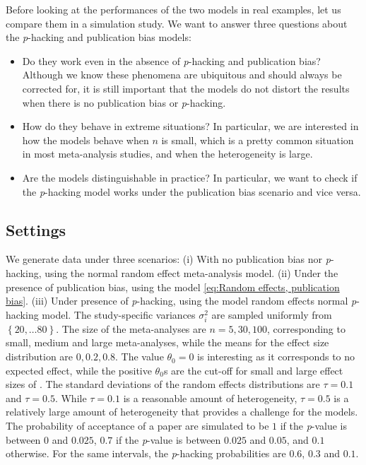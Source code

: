\documentclass{article}
\theoremstyle{plain}
\theoremstyle{definition}
\begin{document}
%
%
Before looking at the performances of the two models in real examples, let us compare them in a simulation study. We want to answer three questions about the \textit{p}-hacking and publication bias models:
\begin{itemize}
\item Do they work even in the absence of \textit{p}-hacking and publication bias? Although we know these phenomena are ubiquitous and should always be corrected for, it is still important that the models do not distort the results when there is no publication bias or \textit{p}-hacking.
\item How do they behave in extreme situations? In particular, we are interested in how the models behave when $n$ is small, which is a pretty common situation in most meta-analysis studies, and when the heterogeneity is large.
\item Are the models distinguishable in practice? In particular, we want to check if the \textit{p}-hacking model works under the publication bias scenario and vice versa.
\end{itemize}

\subsection{Settings}
We generate data under three scenarios: (i) With no publication bias nor \textit{p}-hacking, using the normal random effect meta-analysis model. (ii) Under the presence of publication bias, using the model \eqref{eq:Random effects, publication bias}. (iii) Under presence of \textit{p}-hacking, using the model random effects normal \textit{p}-hacking model. The study-specific variances $\sigma_{i}^{2}$ are sampled uniformly from $\left\{ 20,\ldots80\right\} $. The size of the meta-analyses are $n = 5, 30, 100$, corresponding to small, medium and large meta-analyses, while the means for the effect size distribution are $0, 0.2, 0.8$. The value $\theta_0 = 0$ is interesting as it corresponds to no expected effect, while the positive $\theta_0$s are the cut-off for small and large effect sizes of \citet[][pages 24 -- 27]{cohen1988statistical}. The standard deviations of the random effects distributions are $\tau=0.1$ and $\tau=0.5$. While $\tau = 0.1$ is a reasonable amount of heterogeneity, $\tau=0.5$ is a relatively large amount of heterogeneity that provides a challenge for the models. The probability of acceptance of a paper are simulated to be $1$ if the \textit{p}-value is between $0$ and $0.025$, $0.7$ if the \textit{p}-value is between $0.025$ and $0.05$, and $0.1$ otherwise. For the same intervals, the \textit{p}-hacking probabilities are $0.6$, $0.3$ and $0.1$. 
\end{document}
